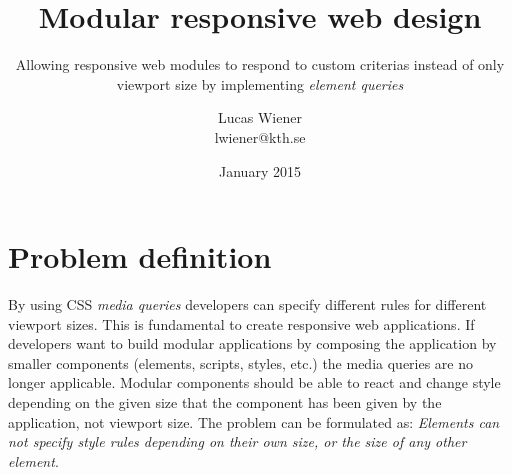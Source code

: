 \documentclass[oneside,a4paper,11pt]{kth-mag}
\title{Modular responsive web design}
\subtitle{Allowing responsive web modules to respond to custom criterias instead of only viewport size by implementing \emph{element queries}}
\author{Lucas Wiener \\ \lowercase{lwiener@kth.se}}
\date{January 2015}
\begin{document}
\frontmatter
\pagestyle{empty}
\removepagenumbers
\maketitle
\mainmatter
\section*{Problem definition}
By using CSS \emph{media queries} developers can specify different rules for different viewport sizes. This is fundamental to create responsive web applications. If developers want to build modular applications by composing the application by smaller components (elements, scripts, styles, etc.) the media queries are no longer applicable. Modular components should be able to react and change style depending on the given size that the component has been given by the application, not viewport size. The problem can be formulated as: \emph{Elements can not specify style rules depending on their own size, or the size of any other element}.
\end{document}
